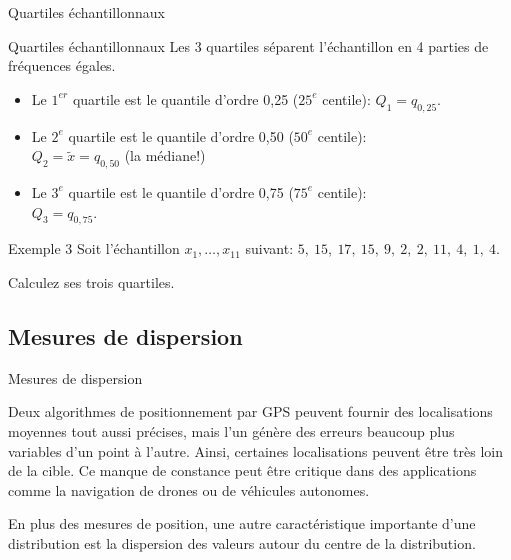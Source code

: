 \documentclass{BeamerTemplate}
\begin{document}
\begin{frame}[t]{Quartiles échantillonnaux}

{\small

\begin{Boite}{Quartiles échantillonnaux}
Les \alert{3 quartiles} séparent l'échantillon en 4 parties de fréquences égales.
\begin{itemize}
\item Le $1^{er}$ quartile est le quantile d'ordre 0,25 ($25^e$ centile): \alert{$Q_1=q_{0,25}$}.
\item Le $2^{e}$ quartile est le quantile d'ordre 0,50 ($50^e$ centile):\\ \alert{$Q_2=\tilde{x}=q_{0,50}$} (la médiane!)
\item Le $3^{e}$ quartile est le quantile d'ordre 0,75 ($75^e$ centile): \\ \alert{$Q_3=q_{0,75}$}.
\end{itemize}
\end{Boite}
}
\end{frame}

\begin{frame}[t]{Exemple 3}
Soit l'échantillon $x_1,\ldots,x_{11}$ suivant:
{\small $5,~ 15,~ 17,~ 15,~  9,~  2,~  2,~ 11,~  4,~  1,~ 4.$}

\vspace{3mm}
Calculez  ses trois quartiles.\\

\end{frame}


\subsection{Mesures de dispersion}

\begin{frame}[t]{Mesures de dispersion}


Deux algorithmes de positionnement par GPS peuvent fournir des localisations moyennes tout aussi précises, mais l’un génère des erreurs beaucoup plus variables d’un point à l’autre. Ainsi, certaines localisations peuvent être très loin de la cible.
Ce manque de constance peut être critique dans des applications comme la navigation de drones ou de véhicules autonomes.

\medskip
En plus des mesures de position, une autre caractéristique importante d'une
distribution est  \alert{la dispersion des valeurs autour du centre de la distribution}.
\end{frame}
\end{document}
